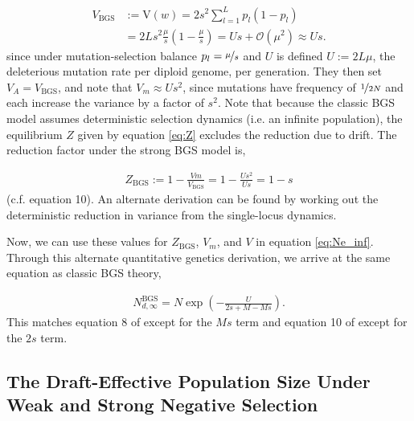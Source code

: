 \documentclass[11pt]{article}
\newcommand{\V}{\text{V}}
\begin{document}
\begin{align}
  \label{eq:va_bgs}
  V_\text{BGS} &:= \V(w) = 2 s^2 \sum_{l=1}^L p_l(1-p_l) \nonumber  \\
            &= 2 L s^2 \frac{\mu}{s} \left( 1 - \frac{\mu}{s}\right) = U s + \mathcal{O}(\mu^2) \approx Us.
\end{align}
%
since under mutation-selection balance $p_l = \nicefrac{\mu}{s}$ and $U$ is
defined $U := 2 L \mu$, the deleterious mutation rate per diploid genome, per
generation. They then set $V_A = V_\text{BGS}$, and note that $V_m \approx
Us^2$, since mutations have frequency of $\nicefrac{1}{2N}$ and each increase
the variance by a factor of $s^2$. Note that because the classic BGS model
assumes deterministic selection dynamics (i.e. an infinite population), the
equilibrium $Z$ given by equation \eqref{eq:Z} excludes the reduction due to
drift. The reduction factor under the strong BGS model is,

\begin{align}
  Z_\text{BGS} := 1 - \frac{Vm}{V_\text{BGS}} = 1 - \frac{Us^2}{Us} = 1 - s
\end{align}
%
(c.f. \cite{Santiago1998-bs} equation 10). An alternate derivation can be found
by working out the deterministic reduction in variance from the single-locus
dynamics. 

Now, we can use these values for $Z_\text{BGS}$, $V_m$, and $V$ in equation
\eqref{eq:Ne_inf}. Through this alternate quantitative genetics derivation, we
arrive at the same equation as classic BGS theory,

\begin{align}
  N_{d,\infty}^\text{BGS} = N \exp\left( - \frac{U}{2s + M - Ms} \right).
\end{align}
%
This matches equation 8 of \textcite{Hudson1995-xc} except for the $Ms$ term
and equation 10 of \textcite{Nordborg1996-nq} except for the $2s$ term.

\subsection{The Draft-Effective Population Size Under Weak and Strong Negative Selection}
\label{supp:weak-strong}
\end{document}
